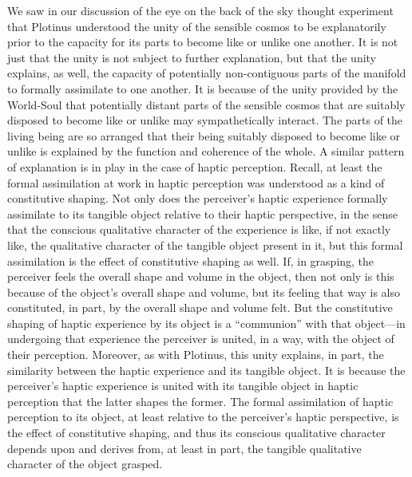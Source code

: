 We saw in our discussion of the eye on the back of the sky thought experiment that Plotinus understood the unity of the sensible cosmos to be explanatorily prior to the capacity for its parts to become like or unlike one another. It is not just that the unity is not subject to further explanation, but that the unity explains, as well, the capacity of potentially non-contiguous parts of the manifold to formally assimilate to one another. It is because of the unity provided by the World-Soul that potentially distant parts of the sensible cosmos that are suitably disposed to become like or unlike may sympathetically interact. The parts of the living being are so arranged that their being suitably disposed to become like or unlike is explained by the function and coherence of the whole. A similar pattern of explanation is in play in the case of haptic perception. Recall, at least the formal assimilation at work in haptic perception was understood as a kind of constitutive shaping. Not only does the perceiver's haptic experience formally assimilate to its tangible object relative to their haptic perspective, in the sense that the conscious qualitative character of the experience is like, if not exactly like, the qualitative character of the tangible object present in it, but this formal assimilation is the effect of constitutive shaping as well. If, in grasping, the perceiver feels the overall shape and volume in the object, then not only is this because of the object's overall shape and volume, but its feeling that way is also constituted, in part, by the overall shape and volume felt. But the constitutive shaping of haptic experience by its object is a ``communion'' with that object---in undergoing that experience the perceiver is united, in a way, with the object of their perception. Moreover, as with Plotinus, this unity explains, in part, the similarity between the haptic experience and its tangible object. It is because the perceiver's haptic experience is united with its tangible object in haptic perception that the latter shapes the former. The formal assimilation of haptic perception to its object, at least relative to the perceiver's haptic perspective, is the effect of constitutive shaping, and thus its conscious qualitative character depends upon and derives from, at least in part, the tangible qualitative character of the object grasped.

